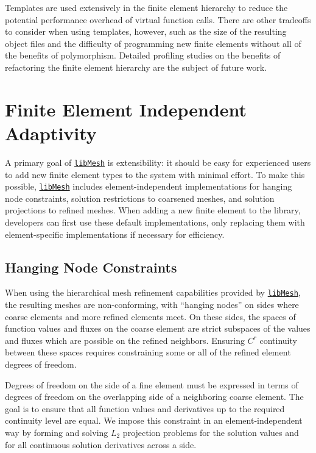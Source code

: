 \documentclass[global,twocolumn,final]{svjour}
\newcommand{\libMesh}{\href{http://libmesh.sourceforge.net}{\texttt{lib\-Mesh}}}
\begin{document}
Templates are used extensively in the finite element hierarchy
to reduce the potential performance overhead of virtual function calls.
There are other tradeoffs to consider when using templates, however,
such as the size of the resulting object files and the difficulty of
programming new finite elements without all of the benefits of
polymorphism.  Detailed profiling studies on the benefits of refactoring
the finite element hierarchy are the subject of future work.


\section{Finite Element Independent Adaptivity}
A primary goal of \libMesh{} is extensibility: it should be easy for
experienced users to add new finite element types to the system with
minimal effort.  To make this possible, \libMesh{} includes
element-independent implementations for hanging node constraints,
solution restrictions to coarsened meshes, and solution projections to
refined meshes.  When adding a new finite element to the library, developers
can first use these default implementations, only replacing them with
element-specific implementations if necessary for efficiency.

\subsection{Hanging Node Constraints}
When using the hierarchical mesh refinement capabilities provided by
\libMesh, the resulting meshes are non-conforming, with ``hanging
nodes'' on sides where coarse elements and more refined elements meet.
On these sides, the spaces of function values and fluxes on the coarse
element are strict subspaces of the values and fluxes which are
possible on the refined neighbors.  Ensuring $C^r$ continuity
between these sp\-aces requires constraining some or all of
the refined element degrees of freedom.

Degrees of freedom on the side of a fine element must be expressed in
terms of degrees of freedom on the overlapping side of a neighboring coarse
element.  The goal is to ensure that all function values and
derivatives up to the required continuity level are equal.  We 
impose this constraint in an element-independent way by forming and
solving $L_2$ projection problems for the solution values and for all
continuous solution derivatives across a side.
\end{document}
